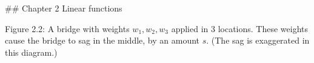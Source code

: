 

## Chapter 2 Linear functions

Figure 2.2: A bridge with weights \(w_{1},w_{2},w_{3}\) applied in 3 locations. These weights cause the bridge to sag in the middle, by an amount \(s\). (The sag is exaggerated in this diagram.)